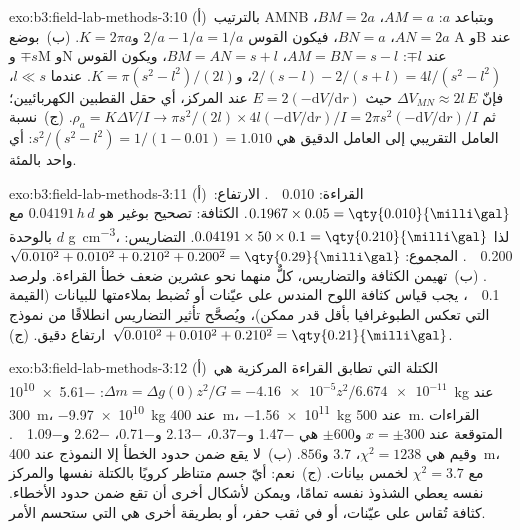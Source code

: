 \begin{solution}{exo:b3:field-lab-methods-3:10}
(أ)~بالترتيب AMNB وبتباعد $a$: $AM = a$، $BM = 2a$، $AN = 2a$،
$BN = a$، فيكون القوس $2/a - 1/a = 1/a$ و$K = 2\pi a$.
(ب)~بوضع A وB عند $\mp s$ وM وN عند $\mp l$: $AM = BN = s - l$،
$BM = AN = s + l$، ويكون القوس $2/(s - l) - 2/(s + l) = 4l/(s^2 -
l^2)$، و$K = \pi(s^2 - l^2)/(2l)$. عندما $l \ll s$، فإنّ $\Delta V_{MN}
\approx 2l\,E$ حيث $E = 2(-\mathrm{d}V/\mathrm{d}r)$ عند المركز، أي
حقل القطبين الكهربائيين؛ ثم $\rho_a = K\Delta V/I \to
\pi s^2/(2l)\times 4l(-\mathrm{d}V/\mathrm{d}r)/I = 2\pi s^2(-
\mathrm{d}V/\mathrm{d}r)/I$. (ج)~نسبة العامل التقريبي إلى
العامل الدقيق هي $s^2/(s^2 - l^2) = 1/(1 - 0.01) = 1.010$: أي واحد بالمئة.
\end{solution}

\begin{solution}{exo:b3:field-lab-methods-3:11}
(أ)~القراءة: \qty{0.010}{\milli\gal}. الارتفاع:
$0.1967\times0.05 = \qty{0.010}{\milli\gal}$. الكثافة: تصحيح بوغير
هو $0.04191\,h\,d$ مع $d$ بالوحدة \unit{g.cm^{-3}}، لذا
$0.04191\times50\times0.1 = \qty{0.210}{\milli\gal}$. التضاريس:
\qty{0.200}{\milli\gal}. المجموع: $\sqrt{0.010^2 + 0.010^2 + 0.210^2 +
0.200^2} = \qty{0.29}{\milli\gal}$. (ب)~تهيمن الكثافة والتضاريس،
كلٌّ منهما نحو عشرين ضعف خطأ القراءة. ولرصد
\qty{0.1}{\milli\gal}، يجب قياس كثافة اللوح المندس على
عيّنات أو تُضبط بملاءمتها للبيانات (القيمة التي تعكس الطبوغرافيا بأقل قدر
ممكن)، ويُصحَّح تأثير التضاريس انطلاقًا من نموذج ارتفاع دقيق.
(ج)~$\sqrt{0.010^2 + 0.010^2 + 0.210^2} = \qty{0.21}{\milli\gal}$.
\end{solution}

\begin{solution}{exo:b3:field-lab-methods-3:12}
(أ)~الكتلة التي تطابق القراءة المركزية هي $\Delta m = \Delta g(0)z^2/G
= \num{-4.16e-5}z^2/\num{6.674e-11}$: \qty{-5.61e10}{kg} عند
\qty{300}{m}، \qty{-9.97e10}{kg} عند \qty{400}{m}، \qty{-1.56e11}{kg} عند
\qty{500}{m}. القراءات المتوقعة عند $x = \pm300$ و$\pm600$ هي
\num{-1.47} و\num{-0.37}، \num{-2.13} و\num{-0.71}، \num{-2.62}
و\qty{-1.09}{\milli\gal}. وقيم  هي $\chi^2 = 1238$، $3.7$
و$856$. (ب)~لا يقع ضمن حدود الخطأ إلا النموذج عند \qty{400}{m}، مع $\chi^2 = 3.7$ لخمس
بيانات. (ج)~نعم: أيّ جسم متناظر كرويًا
بالكتلة نفسها والمركز نفسه يعطي الشذوذ نفسه تمامًا، ويمكن لأشكال أخرى أن تقع
ضمن حدود الأخطاء. كثافة تُقاس على عيّنات، أو في ثقب حفر، أو بطريقة أخرى
هي التي ستحسم الأمر.
\end{solution}


